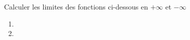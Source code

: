 \begin{exercice}

 Calculer les limites des fonctions ci-dessous en $+\infty$ et $-\infty$
  \begin{enumerate}
  \item {}
  \item {}
  \end{enumerate}
\end{exercice}
